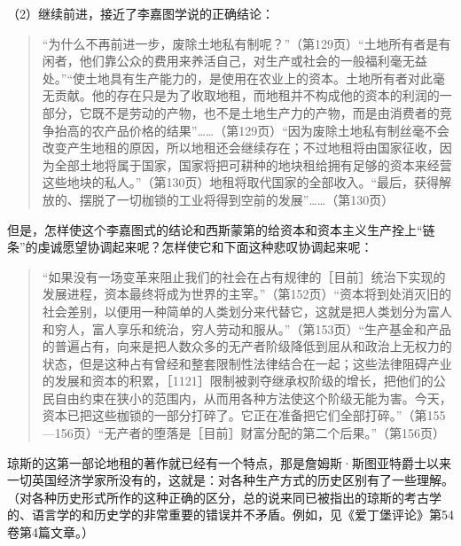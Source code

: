 （2）继续前进，接近了李嘉图学说的正确结论：

\begin{quote}{“为什么不再前进一步，废除土地私有制呢？”（第129页）“土地所有者是有闲者，他们靠公众的费用来养活自己，对生产或社会的一般福利毫无益处。”“使土地具有生产能力的，是使用在农业上的资本。土地所有者对此毫无贡献。他的存在只是为了收取地租，而地租并不构成他的资本的利润的一部分，它既不是劳动的产物，也不是土地生产力的产物，而是由消费者的竞争抬高的农产品价格的结果”……（第129页）“因为废除土地私有制丝毫不会改变产生地租的原因，所以地租还会继续存在；不过地租将由国家征收，因为全部土地将属于国家，国家将把可耕种的地块租给拥有足够的资本来经营这些地块的私人。”（第130页）地租将取代国家的全部收入。“最后，获得解放的、摆脱了一切枷锁的工业将得到空前的发展”……（第130页）}\end{quote}

但是，怎样使这个李嘉图式的结论和西斯蒙第的给资本和资本主义生产拴上“链条”的虔诚愿望协调起来呢？怎样使它和下面这种悲叹协调起来呢：

\begin{quote}{“如果没有一场变革来阻止我们的社会在占有规律的［目前］统治下实现的发展进程，资本最终将成为世界的主宰。”（第152页）“资本将到处消灭旧的社会差别，以便用一种简单的人类划分来代替它，这就是把人类划分为富人和穷人，富人享乐和统治，穷人劳动和服从。”（第153页）“生产基金和产品的普遍占有，向来是把人数众多的无产者阶级降低到屈从和政治上无权力的状态，但是这种占有曾经和整套限制性法律结合在一起；这些法律阻碍产业的发展和资本的积累，［1121］限制被剥夺继承权阶级的增长，把他们的公民自由约束在狭小的范围内，从而用各种方法使这个阶级无能为害。今天，资本已把这些枷锁的一部分打碎了。它正在准备把它们全部打碎。”（第155—156页）“无产者的堕落是［目前］财富分配的第二个后果。”（第156页）}\end{quote}



琼斯的这第一部论地租的著作就已经有一个特点，那是詹姆斯·斯图亚特爵士以来一切英国经济学家所没有的，这就是：对各种生产方式的历史区别有了一些理解。（对各种历史形式所作的这种正确的区分，总的说来同已被指出的琼斯的考古学的、语言学的和历史学的非常重要的错误并不矛盾。例如，见《爱丁堡评论》第54卷第4篇文章。）

